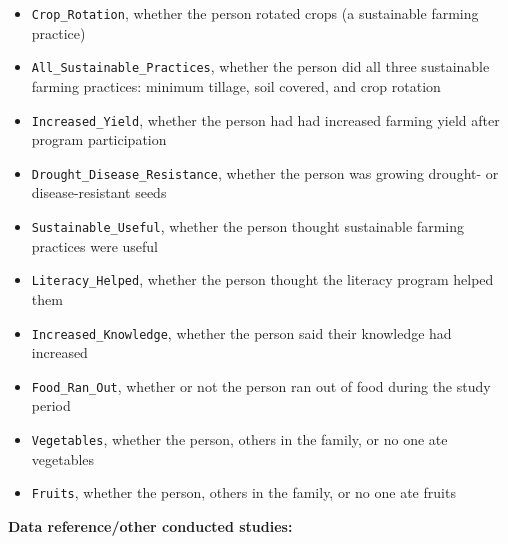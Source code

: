 \documentclass[
  letterpaper,
  DIV=11,
  numbers=noendperiod]{scrartcl}
\begin{document}
\begin{itemize}
\item
  \texttt{Crop\_Rotation}, whether the person rotated crops (a
  sustainable farming practice)
\item
  \texttt{All\_Sustainable\_Practices}, whether the person did all three
  sustainable farming practices: minimum tillage, soil covered, and crop
  rotation
\item
  \texttt{Increased\_Yield}, whether the person had had increased
  farming yield after program participation
\item
  \texttt{Drought\_Disease\_Resistance}, whether the person was growing
  drought- or disease-resistant seeds
\item
  \texttt{Sustainable\_Useful}, whether the person thought sustainable
  farming practices were useful
\item
  \texttt{Literacy\_Helped}, whether the person thought the literacy
  program helped them
\item
  \texttt{Increased\_Knowledge}, whether the person said their knowledge
  had increased
\item
  \texttt{Food\_Ran\_Out}, whether or not the person ran out of food
  during the study period
\item
  \texttt{Vegetables}, whether the person, others in the family, or no
  one ate vegetables
\item
  \texttt{Fruits}, whether the person, others in the family, or no one
  ate fruits
\end{itemize}

\textbf{Data reference/other conducted studies:}
\end{document}
